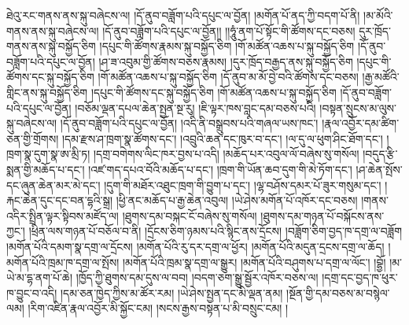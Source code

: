 ཐེའུ་རང་གནས་ནས་སྐུ་བཞེངས་ལ། །དོ་ནུབ་བཟློག་པའི་དཔུང་ལ་བྱོན། །མགོན་པོ་ནད་ཀྱི་བདག་པོ་ནི། །མ་མོའི་གནས་ནས་སྐུ་བཞེངས་ལ། །དོ་ནུབ་བཟློག་པའི་དཔུང་ལ་བྱོན།། །།ཧཱུཾ་ནག་པོ་སྟོང་གི་ཚོགས་དང་བཅས། དུར་ཁྲོད་གནས་ནས་སྐུ་བསྐྱོད་ཅིག །དཔུང་གི་ཚོགས་རྣམས་སྐུ་བསྐྱོད་ཅིག །གོ་མཚོན་འཆས་པ་སྐུ་བསྐྱོད་ཅིག །དོ་ནུབ་བཟློག་པའི་དཔུང་ལ་བྱོན། །ཤ་ཟ་འབུམ་གྱི་ཚོགས་བཅས་རྣམས། །དུར་ཁྲོད་བརྒྱད་ནས་སྐུ་བསྐྱོད་ཅིག །དཔུང་གི་ཚོགས་དང་སྐུ་བསྐྱོད་ཅིག །གོ་མཚོན་འཆས་པ་སྐུ་བསྐྱོད་ཅིག །དོ་ནུབ་མ་མོ་བྱེ་བའི་ཚོགས་དང་བཅས། །རྒྱ་མཚོའི་གླིང་ནས་སྐུ་བསྐྱོད་ཅིག །དཔུང་གི་ཚོགས་དང་སྐུ་བསྐྱོད་ཅིག །གོ་མཚོན་འཆས་པ་སྐུ་བསྐྱོད་ཅིག །དོ་ནུབ་བཟློག་པའི་དཔུང་ལ་བྱོན། །བཅོམ་ལྡན་དཔལ་ཆེན་སྤྱན་སྔ་རུ། །ཇི་ལྟར་ཁས་བླང་དམ་བཅས་པའི། །བསྟན་སྲུངས་མ་ལུས་སྐུ་བཞེངས་ལ། །དོ་ནུབ་བཟློག་པའི་དཔུང་ལ་བྱོན། །འདི་ནི་བསྒྲུབས་པའི་གཞལ་ཡས་ཁང་། །རྣལ་འབྱོར་དམ་ཚིག་ཅན་གྱི་གྲོགས། །དམ་རྫས་ཤ་ཁྲག་སྣ་ཚོགས་དང་། །འབྲུའི་ཆན་དང་ཁུར་བ་དང་། །ལ་དུ་ལ་ཕུག་ཤིང་ཐོག་དང་། །ཁྲག་སྣ་དུག་སྣ་ཨ་མྲི་ཏ། །དགྲ་བགེགས་ལིང་ཁར་བྱས་པ་འདི། །མཆོད་པར་འབུལ་ལོ་བཞེས་སུ་གསོལ། །བདུད་རྩི་སྨན་གྱི་མཆོད་པ་དང་། །འཛ་གད་དཔའ་བོའི་མཆོད་པ་དང་། །ཁྲག་གི་ཡོན་ཆབ་དུག་གི་མེ་ཏོག་དང་། །ཤ་ཆེན་སྤོས་དང་ཞུན་ཆེན་མར་མེ་དང་། །དུག་གི་མཐོར་འཐུང་ཁྲག་གི་བྱུག་པ་དང་། །ལྷ་བཤོས་དམར་པོ་ཟུར་གསུམ་དང་། །རྐང་ཆེན་དུང་དང་བན་དྷའི་སྒྲ། །ཕྱི་ནང་མཆོད་པ་རྒྱ་ཆེན་འབུལ། །ཡེ་ཤེས་མགོན་པོ་འཁོར་དང་བཅས། །གནས་འདིར་སྤྲིན་ལྟར་སྟིབས་མཛོད་ལ། །ཐུགས་དམ་བསྐང་ངོ་བཞེས་སུ་གསོལ། །ཐུགས་དམ་གཉན་པོ་བསྐོངས་ནས་ཀྱང་། །ཕྲིན་ལས་གཉན་པོ་བཅོལ་བ་ནི། །དྲོངས་ཅིག་ཉམས་པའི་སྙིང་ནས་དྲོངས། །བཟློག་ཅིག་བྱད་ཁ་དགྲ་ལ་བཟློག །མགོན་པོའི་དམག་སྣ་དགྲ་ལ་དྲོངས། །མགོན་པོའི་རུ་དར་དགྲ་ལ་ཕྱོར། །མགོན་པོའི་མདུན་དྲངས་དགྲ་ལ་ཆོད། །མགོན་པོའི་ཁྲམ་ཁ་དགྲ་ལ་སྤོས། །མགོན་པོའི་ཁྲམ་སྣ་དགྲ་ལ་སྒྱུར། །མགོན་པོའི་བཤུགས་པ་དགྲ་ལ་ལོང་། །བྷྱོ། །མ་ཡེ་མ་དྷ་ནག་པོ་ཆེ། །ཁྱོད་ཀྱི་ཐུགས་དམ་དུས་ལ་བབ། །བདག་ཅག་སྒྱུ་སྦྱོར་འཁོར་བཅས་ལ། །དགྲ་དང་བྱད་ཁ་ཕུར་ཁ་བྱུང་བ་འདི། །དམ་ཅན་ཁྱེད་ཀྱིས་མ་ཚོར་རམ། །ཡེ་ཤེས་སྤྱན་དང་མི་ལྡན་ནམ། །སྔོན་གྱི་དམ་བཅས་མ་བསྙེལ་ལམ། །རིག་འཛིན་རྣལ་འབྱོར་མི་སྐྱོང་ངམ། །སངས་རྒྱས་བསྟན་པ་མི་བསྲུང་ངམ། །
